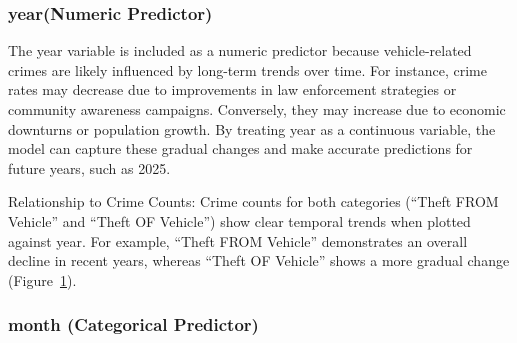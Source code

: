 \documentclass[
  letterpaper,
  DIV=11,
  numbers=noendperiod]{scrartcl}
\begin{document}
\subsubsection{year(Numeric Predictor)}\label{yearnumeric-predictor}

The year variable is included as a numeric predictor because
vehicle-related crimes are likely influenced by long-term trends over
time. For instance, crime rates may decrease due to improvements in law
enforcement strategies or community awareness campaigns. Conversely,
they may increase due to economic downturns or population growth. By
treating year as a continuous variable, the model can capture these
gradual changes and make accurate predictions for future years, such as
2025.

Relationship to Crime Counts: Crime counts for both categories (``Theft
FROM Vehicle'' and ``Theft OF Vehicle'') show clear temporal trends when
plotted against year. For example, ``Theft FROM Vehicle'' demonstrates
an overall decline in recent years, whereas ``Theft OF Vehicle'' shows a
more gradual change (Figure~\ref{fig-year-trend}).

\begin{figure}


\caption{\label{fig-year-trend}}

\end{figure}%

\subsubsection{month (Categorical
Predictor)}\label{month-categorical-predictor}
\end{document}
